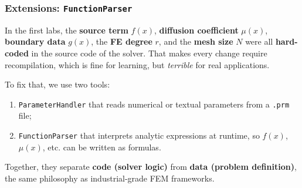 \subsubsection{Extensions: \texttt{FunctionParser}}

In the first labs, the \textbf{source term} $f(x)$, \textbf{diffusion coefficient} $\mu(x)$, \textbf{boundary data} $g(x)$, the \textbf{FE degree} $r$, and the \textbf{mesh size} $N$ were all \textbf{hard-coded} in the source code of the solver. That makes every change require recompilation, which is fine for learning, but \emph{terrible} for real applications.

\highspace
To fix that, we use two  tools:
\begin{enumerate}
    \item \texttt{ParameterHandler} that reads numerical or textual parameters from a \texttt{.prm} file;
    \item \texttt{FunctionParser} that interprets analytic expressions at runtime, so $f(x)$, $\mu(x)$, etc. can be written as formulas.
\end{enumerate}
Together, they separate \textbf{code (solver logic)} from \textbf{data (problem definition)}, the same philosophy as industrial-grade FEM frameworks.

